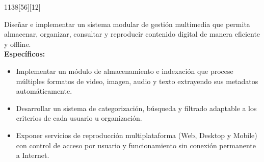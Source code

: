 {\begin{NuevoParrafo}{11}{38}[56][12]
\begin{Marco}[\LineaSupC][\LineaInfC][\LineaIzqC][\LineaDerC][CBlanco]
\begin{Objetivos}[Objetivos]
{					{\linespread{.8}\selectfont Diseñar e implementar un sistema modular de gestión multimedia que permita almacenar, organizar, consultar y reproducir contenido digital de manera eficiente y offline.}\\[0.3cm]
					{\large \textbf{Específicos:}}
					{\begin{itemize}
							\setlength{\itemsep}{-0.5pt}
							\setlength{\parskip}{0pt}
							\setlength{\parsep}{0pt}
							\item Implementar un módulo de almacenamiento e indexación que procese múltiples formatos de video, imagen, audio y texto extrayendo sus metadatos automáticamente.
							\item Desarrollar un sistema de categorización, búsqueda y filtrado adaptable a los criterios de cada usuario u organización.
							\item Exponer servicios de reproducción multiplataforma (Web, Desktop y Mobile) con control de acceso por usuario y funcionamiento sin conexión permanente a Internet. 
					\end{itemize}}
				}
			\end{Objetivos}
		\end{Marco}
	\end{NuevoParrafo}
}
